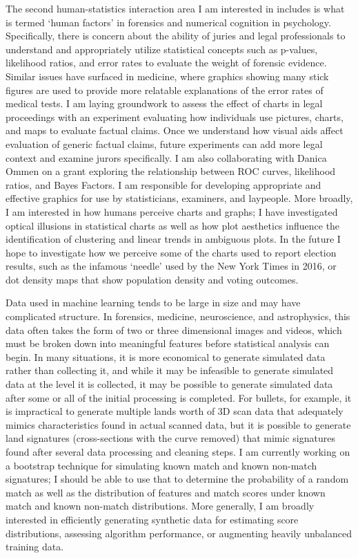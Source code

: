 \documentclass[12pt, letterpaper, sans]{moderncv}
\begin{document}
The second human-statistics interaction area I am interested in includes is what is termed `human factors' in forensics and numerical cognition in psychology. Specifically, there is concern about the ability of juries and legal professionals to understand and appropriately utilize statistical concepts such as p-values, likelihood ratios, and error rates to evaluate the weight of forensic evidence. Similar issues have surfaced in medicine, where graphics showing many stick figures are used to provide more relatable explanations of the error rates of medical tests. I am laying groundwork to assess the effect of charts in legal proceedings with an experiment evaluating how individuals use pictures, charts, and maps to evaluate factual claims. Once we understand how visual aids affect evaluation of generic factual claims, future experiments can add more legal context and examine jurors specifically. I am also collaborating with Danica Ommen on a grant exploring the relationship between ROC curves, likelihood ratios, and Bayes Factors. I am responsible for developing appropriate and effective graphics for use by statisticians, examiners, and laypeople. More broadly, I am interested in how humans perceive charts and graphs; I have investigated optical illusions in statistical charts as well as how plot aesthetics influence the identification of clustering and linear trends in ambiguous plots. In the future I hope to investigate how we perceive some of the charts used to report election results, such as the infamous `needle' used by the New York Times in 2016, or dot density maps that show population density and voting outcomes. 

Data used in machine learning tends to be large in size and may have complicated structure. In forensics, medicine, neuroscience, and astrophysics, this data often takes the form of two or three dimensional images and videos, which must be broken down into meaningful features before statistical analysis can begin. In many situations, it is more economical to generate simulated data rather than collecting it, and while it may be infeasible to generate simulated data at the level it is collected, it may be possible to generate simulated data after some or all of the initial processing is completed. For bullets, for example, it is impractical to generate multiple lands worth of 3D scan data that adequately mimics characteristics found in actual scanned data, but it is possible to generate land signatures (cross-sections with the curve removed) that mimic signatures found after several data processing and cleaning steps. I am currently working on a bootstrap technique for simulating known match and known non-match signatures; I should be able to use that to determine the probability of a random match as well as the distribution of features and match scores under known match and known non-match distributions. More generally, I am broadly interested in efficiently generating synthetic data for estimating score distributions, assessing algorithm performance, or augmenting heavily unbalanced training data. 
\end{document}
